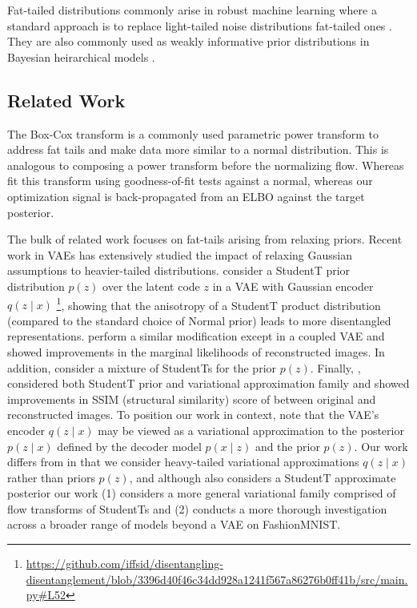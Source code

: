 \documentclass{scrartcl}
\theoremstyle{definition}
\begin{document}
Fat-tailed distributions commonly arise in robust machine learning where a
standard approach is to replace light-tailed noise distributions fat-tailed
ones \cite{tipping2005variational}. They are also commonly used as weakly
informative prior distributions in Bayesian heirarchical models
\cite{gelman2006prior}.

\subsection{Related Work}

The Box-Cox transform \citep{box1964analysis} is a commonly used parametric
power transform to address fat tails and make data more similar to a normal
distribution. This is analogous to composing a power transform before
the normalizing flow. Whereas \cite{asar2017estimating} fit this transform
using goodness-of-fit tests against a normal, whereas our optimization signal
is back-propagated from an ELBO against the target posterior.

The bulk of related work focuses on fat-tails arising from relaxing priors.
Recent work in VAEs has extensively studied the impact of relaxing Gaussian
assumptions to heavier-tailed distributions. \citep{mathieu2019disentangling}
consider a StudentT prior distribution $p(z)$ over the latent code $z$ in a
VAE with Gaussian encoder $q(z \mid x)$
\footnote{\url{https://github.com/iffsid/disentangling-disentanglement/blob/3396d40f46c34dd928a1241f567a86276b0ff41b/src/main.py\#L52}},
showing that the anisotropy of a StudentT product distribution (compared to
the standard choice of Normal prior) leads to more disentangled
representations. \cite{chen2020use} perform a similar modification except in
a coupled VAE \cite{cao2019coupled} and showed improvements in the marginal
likelihoods of reconstructed images. In addition,
\cite{boenninghoff2020variational} consider a mixture of StudentTs for the
prior $p(z)$. Finally, , \cite{abiri2020variational} considered both StudentT prior and
variational approximation family and showed improvements in SSIM (structural
similarity) score of between original and reconstructed images. To position
our work in context, note that the VAE's encoder $q(z \mid x)$ may be viewed
as a variational approximation to the posterior $p(z \mid x)$ defined by the
decoder model $p(x \mid z)$ and the prior $p(z)$. Our work differs from
\citep{mathieu2019disentangling,chen2020use,boenninghoff2020variational} in
that we consider heavy-tailed variational approximations $q(z \mid x)$ rather
than priors $p(z)$, and although \citep{abiri2020variational} also considers
a StudentT approximate posterior our work (1) considers a more general
variational family comprised of flow transforms of StudentTs and (2) conducts
a more thorough investigation across a broader range of models beyond a VAE
on FashionMNIST.
\end{document}
